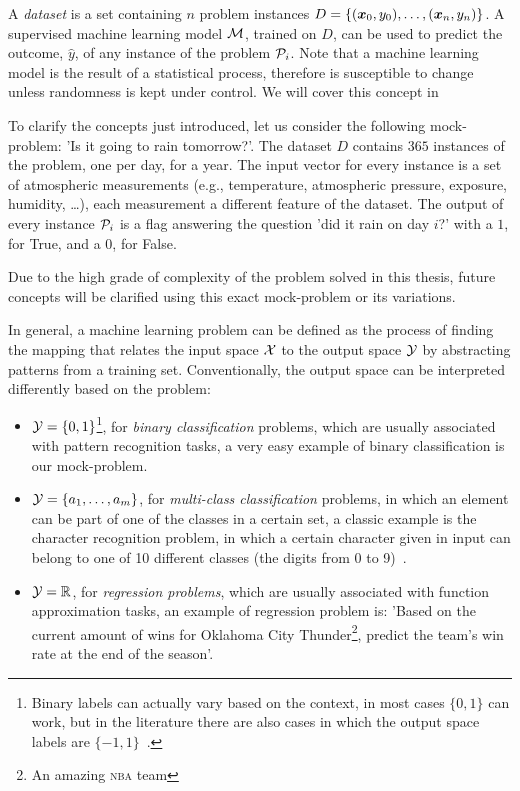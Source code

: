 A \emph{dataset} is a set containing $n$ problem instances $D = \{(\boldsymbol{x}_0, y_0), \allowbreak\ldots\allowbreak, (\boldsymbol{x}_n, y_n)\}$. A supervised machine learning model $\mathcal{M}$, trained on $D$, can be used to predict the outcome, $\hat{y}$, of any instance of the problem $\mathcal{P}_i$. Note that a machine learning model is the result of a statistical process, therefore is susceptible to change unless randomness is kept under control. We will cover this concept in 

To clarify the concepts just introduced, let us consider the following mock-problem: 'Is it going to rain
tomorrow?'. The dataset $D$ contains $365$ instances of the problem, one per day, for a year. The
input vector for every instance is a set of atmospheric measurements (e.g., temperature, atmospheric
pressure, exposure, humidity, \ldots), each measurement a different feature of the dataset. The
output of every instance $\mathcal{P}_i$ is a flag answering the question 'did it rain on day $i$?'
with a $1$, for True, and a $0$, for False.

Due to the high grade of complexity of the problem solved in this thesis, future concepts will be clarified
using this exact mock-problem or its variations.

In general, a machine learning problem can be defined as the process of finding the mapping that
relates the input space $\mathcal{X}$ to the output space $\mathcal{Y}$ by abstracting patterns from
a training set. Conventionally, the output space can be interpreted differently based on
the problem:
\begin{itemize}
	\item $\mathcal{Y} = \{0, 1\}$\footnote{Binary labels can actually vary based on the context, in
		most cases $\{0, 1\}$ can work, but in the literature there are also cases in which
		the output space labels are $\{-1, 1\}$~\cite{ZhouZhi-Hua2021ML}.}, for \emph{binary classification} problems, which are usually associated with pattern recognition tasks, a very easy example of binary classification is our mock-problem. 
	\item $\mathcal{Y} = \{a_1,\ldots, a_m\}$, for \emph{multi-class classification} problems, in
	      which an element can be part of one of the classes in a certain set, a classic
	      example is the character recognition problem, in which a certain character given in
		input can belong to one of 10 different classes (the digits from 0 to 9)~\cite{pal2010handwritten}.
	\item $\mathcal{Y} = \mathbb{R}$, for \emph{regression problems}, which are usually associated
	      with function approximation tasks, an example of regression problem
	      is: 'Based on the current amount of wins for Oklahoma City Thunder\footnote{An
		      amazing \textsc{nba} team}, predict the team's win rate at the end of the season'.
\end{itemize}

